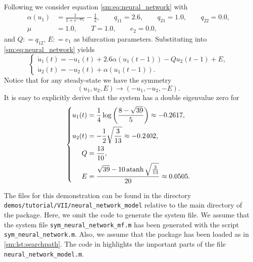 Following \cite{giannakopoulos2001bifurcations} we consider equation \cref{sm:eq:neural_network} with
\begin{align*}
\alpha(u_1) & = \frac{1}{1 + e^{-4u_1}}-\frac{1}{2},\qquad q_{11} = 2.6,\qquad q_{21} = 1.0,\qquad q_{22} = 0.0,\\
\mu & = 1.0,\qquad T = 1.0,\qquad e_2 = 0.0,
\end{align*}
and $Q: = q_{12},\,E: = e_1$ as bifurcation parameters. Substituting
into \cref{sm:eq:neural_network} yields
\begin{equation}
\label{sm:eq:neural_network_subs}
\begin{cases}
\dot{u}_1(t) = -u_1(t) + 2.6\alpha(u_1(t - 1))-Qu_2(t - 1) + E,\\
\dot{u}_2(t) = -u_2(t) + \alpha(u_1(t - 1)).
\end{cases}
\end{equation}
Notice that for any steady-state we have the symmetry
\begin{equation}
\label{sm:eq:neuralNetworkSymmetry}
    (u_1,u_2,E)\rightarrow(-u_1,-u_2,-E).
\end{equation}
It is easy to explicitly derive that
the system has a double eigenvalue zero for
\begin{equation}
\left\{
\begin{aligned}
    u_1(t) &= \frac14 \log\left(\frac{8 - \sqrt{39}}5\right) \approx -0.2617, \\
    u_2(t) &= -\frac12 \sqrt{\frac{3}{13}} \approx -0.2402, \\
    Q &= \frac{13}{10}, \\
    E &= \frac{\sqrt{39} - 10\operatorname{atanh} \sqrt{\frac{3}{13}}}{20} \approx 0.0505.
\end{aligned}
\right.
\end{equation}

\begin{remark} 
    The \MATLAB files for this demonstration can be found in the directory
    \texttt{demos/tutorial/VII/neural_network_model} relative to the main
    directory of the \DDEBIFTOOL package. Here, we omit the code to generate the
    system file. We assume that the system file
    \texttt{sym_neural_network_mf.m} has been
    generated with the script \texttt{sym_neural_network.m}. Also, we assume
    that the \DDEBIFTOOL package has been loaded as in
    \cref{sm:lst:searchpath}. The code in
    highlights the important parts of the file
    \texttt{neural_network_model.m}. 
\end{remark}

